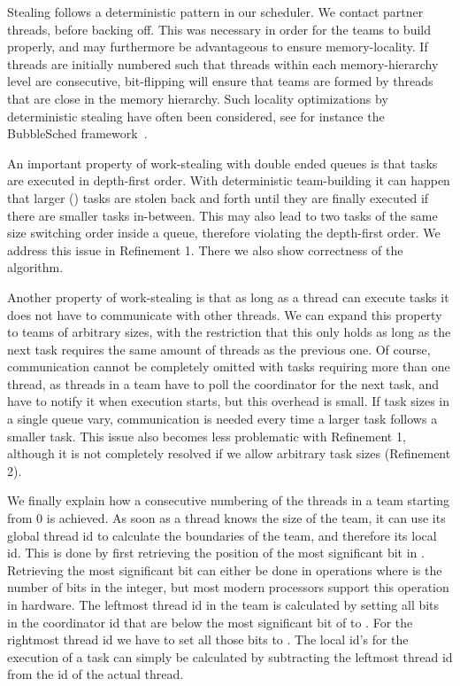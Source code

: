 \documentclass[preprint]{sigplanconf}
\begin{document}
Stealing follows a deterministic pattern in our scheduler. We contact
 partner threads, before backing off. This was necessary in
order for the teams to build properly, and may furthermore be advantageous
to ensure memory-locality.  If threads are initially numbered such that
threads within each  memory-hierarchy level are consecutive,
bit-flipping will ensure that teams are formed by threads that are
close in the memory hierarchy.  Such locality optimizations by
deterministic stealing have often been considered, see for instance
the BubbleSched framework~\cite{Thibault07}. 

An important property of work-stealing with double ended queues is
that tasks are executed in depth-first order. With deterministic
team-building it can happen that larger () tasks are
stolen back and forth until they are finally executed if there are smaller tasks in-between. This may also
lead to two tasks of the same size switching order inside a queue,
therefore violating the depth-first order. We address this issue in
Refinement 1. There we also show correctness of the algorithm. 

Another property of work-stealing is that as long as a thread can
execute tasks it does not have to communicate with other threads. We
can expand this property to teams of arbitrary sizes, with the
restriction that this only holds as long as the next task requires the
same amount of threads as the previous one. Of course, communication
cannot be completely omitted with tasks requiring more than one
thread, as threads in a team have to poll the coordinator for the next
task, and have to notify it when execution starts, but this overhead
is small.  If task sizes in a single queue vary, communication is
needed every time a larger task follows a smaller task. This issue
also becomes less problematic with Refinement 1, although it is not
completely resolved if we allow arbitrary task sizes (Refinement 2).

We finally explain how a consecutive numbering of the threads in a
team starting from 0 is achieved.  As soon as a thread knows the size
of the team, it can use its global thread id to calculate the
boundaries of the team, and therefore its local id. This is done by
first retrieving the position of the most significant bit in
. Retrieving the most significant bit can either be done in  operations where  is the number of bits in the integer, but most
modern processors support this operation in hardware. The leftmost
thread id in the team is calculated by setting all bits in the
coordinator id that are below the most significant bit of  to
. For the rightmost thread id we have to set all those bits to
. The local id's for the execution of a task can simply be
calculated by subtracting the leftmost thread id from the id of the
actual thread.
\end{document}

